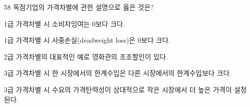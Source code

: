 \begin{question}{58}
독점기업의 가격차별에 관한 설명으로 옳은 것은?
\begin{choices}
  \item 1급 가격차별 시 소비자잉여는 0보다 크다.
  \item 1급 가격차별 시 사중손실(deadweight loss)은 0보다 크다.
  \item 2급 가격차별의 대표적인 예로 영화관의 조조할인이 있다.
  \item 3급 가격차별 시 한 시장에서의 한계수입은 다른 시장에서의 한계수입보다 크다.
  \item 3급 가격차별 시 수요의 가격탄력성이 상대적으로 작은 시장에서 더 높은 가격이 설정된다.
\end{choices}
\end{question}
